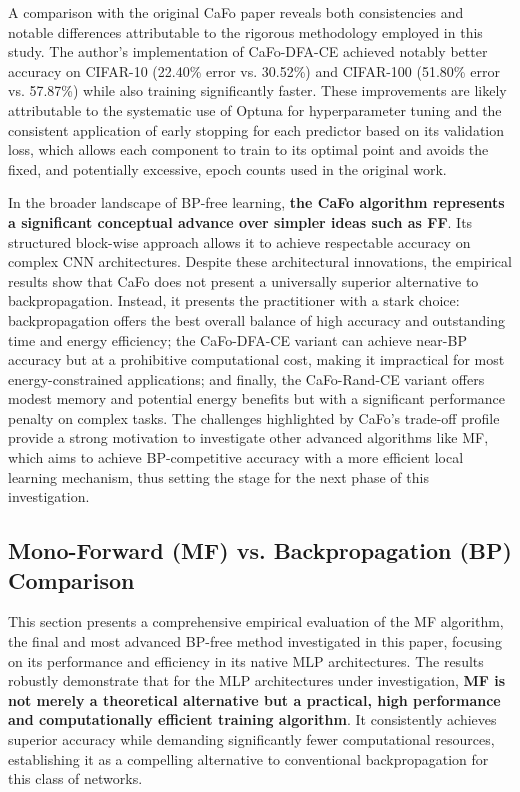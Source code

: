 A comparison with the original CaFo paper reveals both consistencies and notable differences attributable to the rigorous methodology employed in this study. The author's implementation of CaFo-DFA-CE achieved notably better accuracy on CIFAR-10 (22.40\% error vs. 30.52\%) and CIFAR-100 (51.80\% error vs. 57.87\%) while also training significantly faster. These improvements are likely attributable to the systematic use of Optuna for hyperparameter tuning and the consistent application of early stopping for each predictor based on its validation loss, which allows each component to train to its optimal point and avoids the fixed, and potentially excessive, epoch counts used in the original work.

In the broader landscape of BP-free learning, \textbf{the CaFo algorithm represents a significant conceptual advance over simpler ideas such as FF}. Its structured block-wise approach allows it to achieve respectable accuracy on complex CNN architectures. Despite these architectural innovations, the empirical results show that CaFo does not present a universally superior alternative to backpropagation. Instead, it presents the practitioner with a stark choice: backpropagation offers the best overall balance of high accuracy and outstanding time and energy efficiency; the CaFo-DFA-CE variant can achieve near-BP accuracy but at a prohibitive computational cost, making it impractical for most energy-constrained applications; and finally, the CaFo-Rand-CE variant offers modest memory and potential energy benefits but with a significant performance penalty on complex tasks. The challenges highlighted by CaFo's trade-off profile provide a strong motivation to investigate other advanced algorithms like MF, which aims to achieve BP-competitive accuracy with a more efficient local learning mechanism, thus setting the stage for the next phase of this investigation.

\subsection{Mono-Forward (MF) vs. Backpropagation (BP) Comparison}
\label{sec:exp_mf_vs_bp_ch4_final}

This section presents a comprehensive empirical evaluation of the MF algorithm, the final and most advanced BP-free method investigated in this paper, focusing on its performance and efficiency in its native MLP architectures. The results robustly demonstrate that for the MLP architectures under investigation, \textbf{MF is not merely a theoretical alternative but a practical, high performance and computationally efficient training algorithm}. It consistently achieves superior accuracy while demanding significantly fewer computational resources, establishing it as a compelling alternative to conventional backpropagation for this class of networks.

